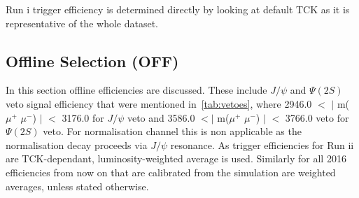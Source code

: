Run \Rn{1} trigger efficiency is determined directly by looking at default TCK as it is representative of the whole dataset.%





\subsection{Offline Selection (OFF)}

In this section offline efficiencies are discussed. These include $J/\psi$ and $\Psi(2S)$ veto signal efficiency that were mentioned in~\autoref{tab:vetoes}, where 2946.0 $<$ $|$ m($\mu^{+}$ $\mu^{-}$) $|$ $<$ 3176.0 for $J/\psi$ veto and 3586.0 $<|$ m($\mu^{+}$ $\mu^{-}$) $|$ $<$ 3766.0 veto for $\Psi(2S)$ veto. For normalisation channel this is non applicable as the normalisation decay proceeds via $J/\psi$ resonance. As trigger efficiencies for Run \Rn{2} are TCK-dependant, luminosity-weighted average is used. Similarly for all 2016 efficiencies from now on that are calibrated from the simulation are weighted averages, unless stated otherwise.


